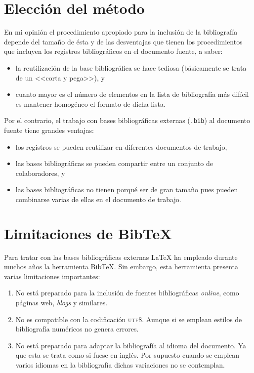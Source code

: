 \documentclass[11pt,a4paper]{article}
\begin{document}
\section{Elección del método}
En mi opinión el procedimiento apropiado para la inclusión de la bibliografía depende del tamaño de ésta y de las desventajas que tienen los procedimientos que incluyen los registros bibliográficos en el documento fuente, a saber: 
\begin{itemize}
	\item la reutilización de la base bibliográfica se hace tediosa (básicamente se trata de un <<corta y pega>>), y
	\item cuanto mayor es el número de elementos en la lista de bibliografía más difícil es mantener homogéneo el formato de dicha lista.
\end{itemize}

Por el contrario, el trabajo con bases bibliográficas externas (\texttt{.bib}) al documento fuente tiene grandes ventajas:
\begin{itemize}
	\item los registros se pueden reutilizar en diferentes documentos de trabajo,
	\item las bases bibliográficas se pueden compartir entre un conjunto de colaboradores, y
	\item las bases bibliográficas no tienen porqué ser de gran tamaño pues pueden combinarse varias de ellas en el documento de trabajo.
\end{itemize}

\section{Limitaciones de Bib\TeX}
Para tratar con las bases bibliográficas externas \LaTeX{} ha empleado durante muchos años la herramienta Bib\TeX{}. Sin embargo, esta herramienta presenta varias limitaciones importantes:
\begin{enumerate}
	\item No está preparado para la inclusión de fuentes bibliográficas \emph{online}, como páginas web, \emph{blogs} y similares.
	
	\item No es compatible con la codificación \textsc{utf8}. Aunque si se emplean estilos de bibliografía numéricos no genera errores.
	
	\item No está preparado para adaptar la bibliografía al idioma del documento. Ya que esta se trata como si fuese en inglés. Por supuesto cuando se emplean varios idiomas en la bibliografía dichas variaciones no se contemplan.
\end{enumerate}
\end{document}
